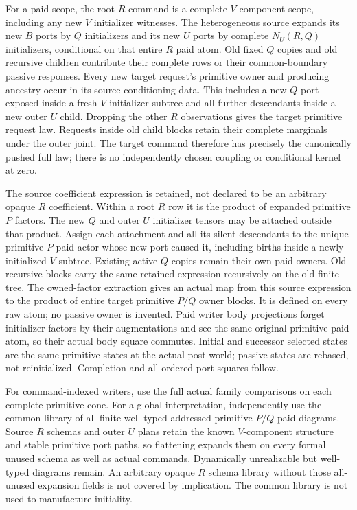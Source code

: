 \documentclass[11pt]{article}\usepackage{amsmath,amssymb,amsthm,geometry}\geometry{margin=1in}\newtheorem{theorem}{Theorem}
\begin{document}
For a paid scope, the root $R$ command is a complete $V$-component scope, including any new $V$ initializer witnesses. The heterogeneous source expands its new $B$ ports by $Q$ initializers and its new $U$ ports by complete $N_U(R,Q)$ initializers, conditional on that entire $R$ paid atom. Old fixed $Q$ copies and old recursive children contribute their complete rows or their common-boundary passive responses. Every new target request's primitive owner and producing ancestry occur in its source conditioning data. This includes a new $Q$ port exposed inside a fresh $V$ initializer subtree and all further descendants inside a new outer $U$ child. Dropping the other $R$ observations gives the target primitive request law. Requests inside old child blocks retain their complete marginals under the outer joint. The target command therefore has precisely the canonically pushed full law; there is no independently chosen coupling or conditional kernel at zero.

The source coefficient expression is retained, not declared to be an arbitrary opaque $R$ coefficient. Within a root $R$ row it is the product of expanded primitive $P$ factors. The new $Q$ and outer $U$ initializer tensors may be attached outside that product. Assign each attachment and all its silent descendants to the unique primitive $P$ paid actor whose new port caused it, including births inside a newly initialized $V$ subtree. Existing active $Q$ copies remain their own paid owners. Old recursive blocks carry the same retained expression recursively on the old finite tree. The owned-factor extraction gives an actual map from this source expression to the product of entire target primitive $P/Q$ owner blocks. It is defined on every raw atom; no passive owner is invented. Paid writer body projections forget initializer factors by their augmentations and see the same original primitive paid atom, so their actual body square commutes. Initial and successor selected states are the same primitive states at the actual post-world; passive states are rebased, not reinitialized. Completion and all ordered-port squares follow.

For command-indexed writers, use the full actual family comparisons on each complete primitive cone. For a global interpretation, independently use the common library of all finite well-typed addressed primitive $P/Q$ paid diagrams. Source $R$ schemas and outer $U$ plans retain the known $V$-component structure and stable primitive port paths, so flattening expands them on every formal unused schema as well as actual commands. Dynamically unrealizable but well-typed diagrams remain. An arbitrary opaque $R$ schema library without those all-unused expansion fields is not covered by implication. The common library is not used to manufacture initiality.
\end{document}
